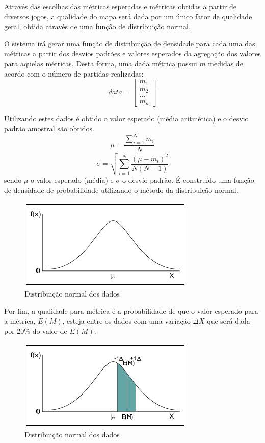 Através das escolhas das métricas esperadas e métricas obtidas a partir de diversos jogos, a qualidade do mapa será dada por um único fator de qualidade geral, obtida através de uma função de distribuição normal.

O sistema irá gerar uma função de distribuição de densidade \cite{montgomery} para cada uma das métricas a partir dos desvios padrões e valores esperados da agregação dos valores para aquelas métricas. Desta forma, uma dada métrica possui $m$ medidas de acordo com o número de partidas realizadas:
\begin{equation}
data = 
\begin{bmatrix}
	m_1 \\
	m_2 \\
	... \\
	m_n
\end{bmatrix}
\end{equation}

Utilizando estes dados é obtido o valor esperado (média aritmética) e o desvio padrão amostral são obtidos.
\begin{equation}
	\mu = \frac{\sum_{i=1}^{N} m_i}{N}
\end{equation}
\begin{equation}
	\sigma = \sqrt{\sum_{i=1}^{N} \frac{(\mu-m_i)^2}{N(N-1)}}
\end{equation}
sendo $\mu$ o valor esperado (média) e $\sigma$ o desvio padrão. É construído uma função de densidade de probabilidade utilizando o método da distribuição normal. 
\begin{figure}[h]
	\centering
	\label{fig15}
		\includegraphics[keepaspectratio=true,scale=0.7]{figuras/fig15-normal.png}
	\caption{Distribuição normal dos dados}
\end{figure}

Por fim, a qualidade para métrica é a probabilidade de que o valor esperado para a métrica, $E(M)$, esteja entre os dados com uma variação $\Delta X$ que será dada por 20\% do valor de $E(M)$.

\begin{figure}[h]
	\centering
	\label{fig16}
		\includegraphics[keepaspectratio=true,scale=0.7]{figuras/fig16-normal2.png}
	\caption{Distribuição normal dos dados}
\end{figure} 

